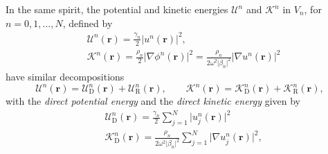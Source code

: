 \documentclass{article}
\begin{document}


In the same spirit, the potential and kinetic energies $\mathcal{U}^n$ and $\mathcal{K}^n$ in $V_n$, for $n=0,1,\ldots,N$,  defined by
%
\begin{align}
    &\mathcal{U}^n(\mathbf{r})=\frac{\gamma_n}{2}\lvert u^n(\mathbf{r})\rvert^2,\\
    &\mathcal{K}^n(\mathbf{r})=\frac{\rho_n}{2}\lvert\nabla\phi^n(\mathbf{r})\rvert^2=\frac{\rho_n}{2\omega^2\lvert \beta_n\rvert^2}\lvert\nabla u^n(\mathbf{r})\rvert^2
\end{align}
%
have similar decompositions 
%
\begin{equation}
    \mathcal{U}^n(\mathbf{r})=\mathcal{U}^n_{\mathrm{D}}(\mathbf{r})+\mathcal{U}^n_{\mathrm{R}}(\mathbf{r}), \qquad \mathcal{K}^n(\mathbf{r})=\mathcal{K}^n_{\mathrm{D}}(\mathbf{r})+\mathcal{K}^n_{\mathrm{R}}(\mathbf{r}),
\end{equation}
%
with the \emph{direct potential energy} and the \emph{direct kinetic energy} given by
%
\begin{align}\label{potential_direct}
    &\mathcal{U}^n_{\mathrm{D}}(\mathbf{r})=\frac{\gamma_n}{2}\sum_{j=1}^{N}\lvert u_j^n(\mathbf{r})\rvert^2\\
    &\mathcal{K}^n_{\mathrm{D}}(\mathbf{r})=\frac{\rho_n}{2\omega^2\lvert \beta_n\rvert^2}\sum_{j=1}^{N}\lvert\nabla u_j^n(\mathbf{r})\rvert^2,
    \label{kinetic_direct}
\end{align}
\end{document}
